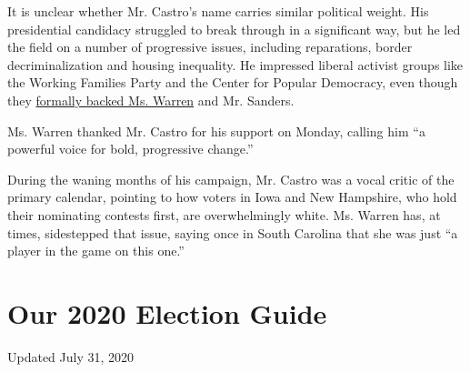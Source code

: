 It is unclear whether Mr. Castro's name carries similar political
weight. His presidential candidacy struggled to break through in a
significant way, but he led the field on a number of progressive issues,
including reparations, border decriminalization and housing inequality.
He impressed liberal activist groups like the Working Families Party and
the Center for Popular Democracy, even though they
\href{https://www.nytimes.com/2019/09/16/us/politics/working-families-party-elizabeth-warren.html}{formally
backed Ms. Warren} and Mr. Sanders.

Ms. Warren thanked Mr. Castro for his support on Monday, calling him ``a
powerful voice for bold, progressive change.''

During the waning months of his campaign, Mr. Castro was a vocal critic
of the primary calendar, pointing to how voters in Iowa and New
Hampshire, who hold their nominating contests first, are overwhelmingly
white. Ms. Warren has, at times, sidestepped that issue, saying once in
South Carolina that she was just ``a player in the game on this one.''

\hypertarget{our-2020-election-guide}{%
\section{Our 2020 Election Guide}\label{our-2020-election-guide}}

Updated July 31, 2020

